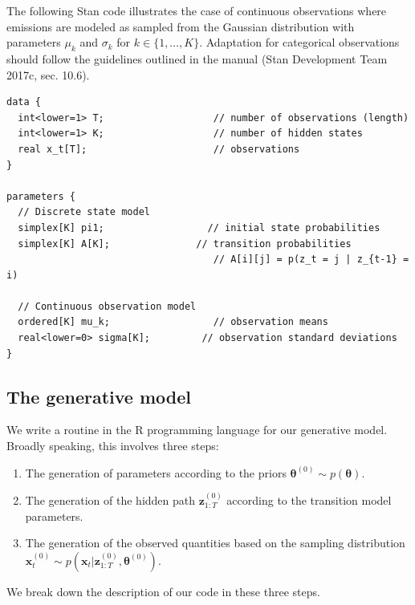 \documentclass[]{article}
\providecommand{\tightlist}{%
  \setlength{\itemsep}{0pt}\setlength{\parskip}{0pt}}
\newcommand{\mat}[1]{\mathbf{#1}}
\begin{document}
The following Stan code illustrates the case of continuous observations
where emissions are modeled as sampled from the Gaussian distribution
with parameters \(\mu_k\) and \(\sigma_k\) for
\(k \in \{1, \dots, K\}\). Adaptation for categorical observations
should follow the guidelines outlined in the manual (Stan Development
Team 2017c, sec. 10.6).

\begin{verbatim}
data {
  int<lower=1> T;                   // number of observations (length)
  int<lower=1> K;                   // number of hidden states
  real x_t[T];                      // observations
}

parameters {
  // Discrete state model
  simplex[K] pi1;                  // initial state probabilities
  simplex[K] A[K];               // transition probabilities
                                    // A[i][j] = p(z_t = j | z_{t-1} = i)

  // Continuous observation model
  ordered[K] mu_k;                  // observation means
  real<lower=0> sigma[K];         // observation standard deviations
}
\end{verbatim}

\subsection{The generative model}\label{the-generative-model}

We write a routine in the R programming language for our generative
model. Broadly speaking, this involves three steps:

\begin{enumerate}
\def\labelenumi{\arabic{enumi}.}
\tightlist
\item
  The generation of parameters according to the priors
  \(\mat{\theta}^{(0)} \sim p(\mat{\theta})\).
\item
  The generation of the hidden path \(\mat{z}_{1:T}^{(0)}\) according to
  the transition model parameters.
\item
  The generation of the observed quantities based on the sampling
  distribution
  \(\mat{x}_t^{(0)} \sim p(\mat{x}_t | \mat{z}_{1:T}^{(0)}, \mat{\theta}^{(0)})\).
\end{enumerate}

We break down the description of our code in these three steps.
\end{document}
